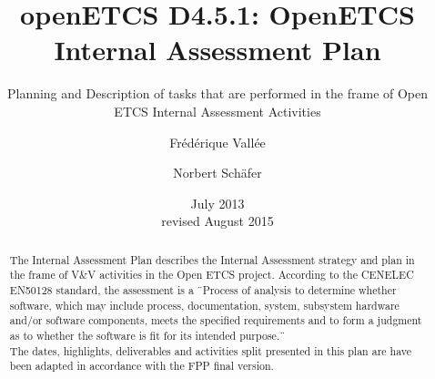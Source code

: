 \documentclass{template/openetcs_article}
\begin{document}
\frontmatter
{}




\title{openETCS D4.5.1: OpenETCS Internal Assessment Plan}

\subtitle{Planning and Description of tasks that are performed in the frame of Open ETCS Internal Assessment Activities}

\date{July 2013\\revised August 2015}

\author{Fr\'ed\'erique Vall\'ee}


\author{Norbert Sch\"afer}









\begin{abstract}
The Internal Assessment Plan describes the Internal Assessment strategy and plan in the frame of V\&V activities in the Open ETCS project.
According to the CENELEC EN50128 \cite{EN50128:2011} standard, the assessment is a \"\ Process of analysis to determine whether software, which may include process, documentation, system, subsystem hardware and/or software components, meets the specified requirements and to form a judgment as to whether the software is fit for its intended purpose.\"\
\\
The dates, highlights, deliverables and activities split presented in this plan are have been adapted in accordance with the FPP \cite{FPP} final version.
\end{abstract}
\end{document}
